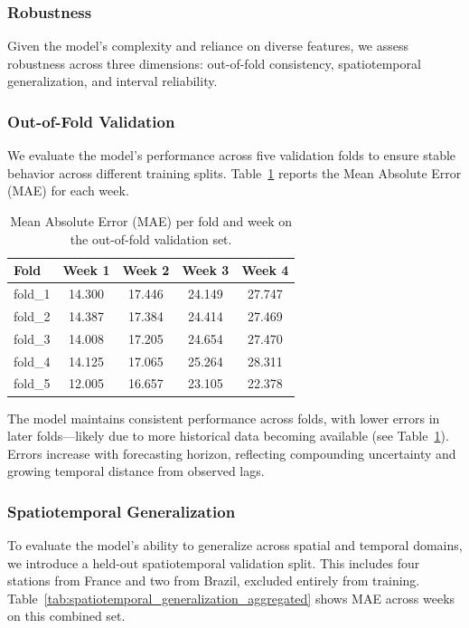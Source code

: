 \documentclass[ruler]{CUP-JNL-EDS}%
\begin{document}
\subsubsection{Robustness}
\label{sec:robustness}

Given the model's complexity and reliance on diverse features, we assess robustness across three dimensions: out-of-fold consistency, spatiotemporal generalization, and interval reliability.

\subsubsection*{Out-of-Fold Validation}
We evaluate the model's performance across five validation folds to ensure stable behavior across different training splits. Table~\ref{tab:mae_per_fold_week} reports the Mean Absolute Error (MAE) for each week.

\begin{table}[!htp]
\centering
\begin{tabular}{lcccc}
\hline
\textbf{Fold} & \textbf{Week 1} & \textbf{Week 2} & \textbf{Week 3} & \textbf{Week 4} \\
\hline
fold\_1 & 14.300 & 17.446 & 24.149 & 27.747 \\
fold\_2 & 14.387 & 17.384 & 24.414 & 27.469 \\
fold\_3 & 14.008 & 17.205 & 24.654 & 27.470 \\
fold\_4 & 14.125 & 17.065 & 25.264 & 28.311 \\
fold\_5 & 12.005 & 16.657 & 23.105 & 22.378 \\
\hline
\end{tabular}
\caption{Mean Absolute Error (MAE) per fold and week on the out-of-fold validation set.}
\label{tab:mae_per_fold_week}
\end{table}

\noindent The model maintains consistent performance across folds, with lower errors in later folds—likely due to more historical data becoming available (see Table~\ref{tab:mae_per_fold_week}). Errors increase with forecasting horizon, reflecting compounding uncertainty and growing temporal distance from observed lags.

\subsubsection*{Spatiotemporal Generalization}
To evaluate the model's ability to generalize across spatial and temporal domains, we introduce a held-out spatiotemporal validation split. This includes four stations from France and two from Brazil, excluded entirely from training. Table~\ref{tab:spatiotemporal_generalization_aggregated} shows MAE across weeks on this combined set.
\end{document}
